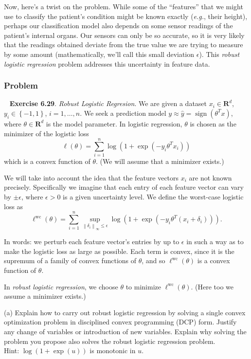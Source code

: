 \documentclass[12pt,reqno]{article}
\theoremstyle{definition}
\numberwithin{equation}{section}
\begin{document}
\noindent Now, here's a twist on the problem. While some of the ``features'' that we might use to classify the patient's condition
might be known exactly (\textit{e.g.}, their height), perhaps our classification model also depends on some sensor readings
of the patient's internal organs. Our sensors can only be so accurate, so it is very likely that the readings obtained
deviate from the true value we are trying to measure by some amount (mathematically, we'll call this small deviation $\epsilon$).
This \textit{robust logistic regression} problem addresses this uncertainty in feature data.

\subsubsection*{Problem}

~\cite{EE364a-extra} \textbf{Exercise 6.29}. \textit{Robust Logistic Regresion}.
We are given a dataset $x_i \in \mathbf{R}^d$, $y_i \in \left\{ -1, 1 \right\}$, $i = 1, \ldots, n$.
We seek a prediction model $y \approx \hat{y}=\operatorname{sign}\left(\theta^T x\right)$, where $\theta \in \mathbf{R}^d$ is the model parameter. In logistic regression, $\theta$ is chosen as the minimizer of the logistic loss
\[
\ell(\theta)=\sum_{i=1}^n \log \left(1+\exp \left(-y_i \theta^T x_i\right)\right)
\]
which is a convex function of $\theta$. (We will assume that a minimizer exists.)

\noindent We will take into account the idea that the feature vectors $x_i$ are not known precisely.
Specifically we imagine that each entry of each feature vector can vary by $\pm \epsilon$, where $\epsilon>0$ is a given uncertainty level.
We define the worst-case logistic loss as
\[
\ell^{\mathrm{wc}}(\theta)=\sum_{i=1}^n \sup _{\left\|\delta_i\right\|_{\infty} \leq \epsilon} \log \left(1+\exp \left(-y_i \theta^T\left(x_i+\delta_i\right)\right)\right) .
\]

\noindent In words: we perturb each feature vector's entries by up to $\epsilon$ in such a way as to make the logistic loss as large as possible. Each term is convex, since it is the supremum of a family of convex functions of $\theta$, and so $\ell^{\mathrm{wc}}(\theta)$ is a convex function of $\theta$.

\vspace{0.1cm}
\noindent In \textit{robust logistic regression}, we choose $\theta$ to minimize $\ell^{\mathrm{wc}}(\theta)$.
(Here too we assume a minimizer exists.)

\vspace{0.1cm}
\noindent (a) Explain how to carry out robust logistic regression by solving a single convex optimization problem in disciplined convex programming (DCP) form.
Justify any change of variables or introduction of new variables.
Explain why solving the problem you propose also solves the robust logistic regression problem.\\
\noindent Hint: $\log (1+\exp (u))$ is monotonic in $u$.
\end{document}

